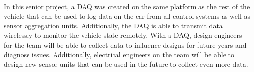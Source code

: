\paragraph{}
In this senior project, a DAQ was created on the same platform as the rest of the vehicle that can be used to log data on the car from all control systems as well as sensor aggregation units.
Additionally, the DAQ is able to transmit data wirelessly to monitor the vehicle state remotely.
With a DAQ, design engineers for the team will be able to collect data to influence designs for future years and diagnose issues.
Additionally, electrical engineers on the team will be able to design new sensor units that can be used in the future to collect even more data.
